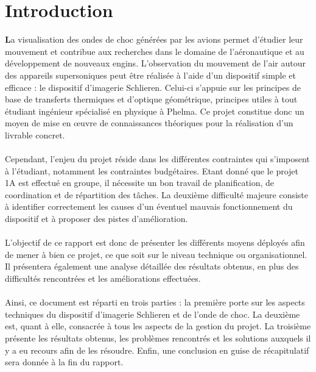 \section*{Introduction}
\textbf{L}a visualisation des ondes de choc générées par les avions permet d’étudier leur mouvement et contribue aux recherches dans le domaine de l’aéronautique et au développement de nouveaux engins. L’observation du mouvement de l’air autour des appareils supersoniques peut être réalisée à l’aide d’un dispositif simple et efficace : le dispositif d’imagerie Schlieren. Celui-ci s’appuie sur les principes de base de transferts thermiques et d’optique géométrique,  principes utiles à tout étudiant ingénieur spécialisé en physique à Phelma. Ce projet constitue donc un moyen de mise en œuvre de connaissances théoriques pour la réalisation d’un livrable concret.
\\
\\
Cependant, l’enjeu du projet réside dans les différentes contraintes qui s’imposent à l’étudiant, notamment les contraintes budgétaires. Etant donné que le projet 1A est effectué en groupe, il nécessite un bon travail de planification, de coordination et de répartition des tâches. La deuxième difficulté majeure consiste à identifier correctement les causes d’un éventuel mauvais fonctionnement du dispositif et à proposer des pistes d’amélioration.
\\
\\
L’objectif de ce rapport est donc de présenter les différents moyens déployés afin de mener à bien ce projet, ce que soit sur le niveau technique ou organisationnel. Il présentera également une analyse détaillée des résultats obtenus, en plus des difficultés rencontrées et les améliorations effectuées.
\\
\\
Ainsi, ce document est réparti en trois parties : la première porte sur les aspects techniques du dispositif d’imagerie Schlieren et de l’onde de choc. La deuxième est, quant à elle, consacrée à tous les aspects de la gestion du projet. La troisième présente les résultats obtenus, les problèmes rencontrés et les solutions auxquels il y a eu recours afin de les résoudre. Enfin, une conclusion en guise de récapitulatif sera donnée à la fin du rapport.
